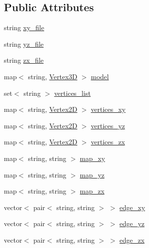 \subsection*{Public Attributes}
\begin{DoxyCompactItemize}
\item 
string \hyperlink{class_two___to___three_a552bbac302db3a8d39d0b0c9014e717d}{xy\+\_\+file}
\item 
string \hyperlink{class_two___to___three_a17e155076c64e9207f9e10d7db944fbe}{yz\+\_\+file}
\item 
string \hyperlink{class_two___to___three_a102a4276583a481691dd6f717a81e11e}{zx\+\_\+file}
\item 
map$<$ string, \hyperlink{struct_vertex3_d}{Vertex3D} $>$ \hyperlink{class_two___to___three_aa57efe556b563e0e5b45fa9f1653c1cd}{model}
\item 
set$<$ string $>$ \hyperlink{class_two___to___three_a2f42478bfa5c2e759df2caac98e12b22}{vertices\+\_\+list}
\item 
map$<$ string, \hyperlink{struct_vertex2_d}{Vertex2D} $>$ \hyperlink{class_two___to___three_aa324b095f53b74973a1ed45d80bf401f}{vertices\+\_\+xy}
\item 
map$<$ string, \hyperlink{struct_vertex2_d}{Vertex2D} $>$ \hyperlink{class_two___to___three_a8052b332b93963257e5e1eff1acbf3f7}{vertices\+\_\+yz}
\item 
map$<$ string, \hyperlink{struct_vertex2_d}{Vertex2D} $>$ \hyperlink{class_two___to___three_a4bd1e4471ca424af9640f70f6b146fb1}{vertices\+\_\+zx}
\item 
map$<$ string, string $>$ \hyperlink{class_two___to___three_a699e1b081ba68063b84ee0628f1824f1}{map\+\_\+xy}
\item 
map$<$ string, string $>$ \hyperlink{class_two___to___three_ab50e85aa8226e964ba2fcbf95fade23d}{map\+\_\+yz}
\item 
map$<$ string, string $>$ \hyperlink{class_two___to___three_a6c016590ff5c2c305eaa571e6d8f47ed}{map\+\_\+zx}
\item 
vector$<$ pair$<$ string, string $>$ $>$ \hyperlink{class_two___to___three_aa0701d423859854d6dcf6a3948c3c797}{edge\+\_\+xy}
\item 
vector$<$ pair$<$ string, string $>$ $>$ \hyperlink{class_two___to___three_a8fa25ea9719f9ecea3d8a521f5e7e14c}{edge\+\_\+yz}
\item 
vector$<$ pair$<$ string, string $>$ $>$ \hyperlink{class_two___to___three_a1a77bc05b0101d52a3cdeca1cda97382}{edge\+\_\+zx}
\item 

\end{DoxyCompactItemize}
